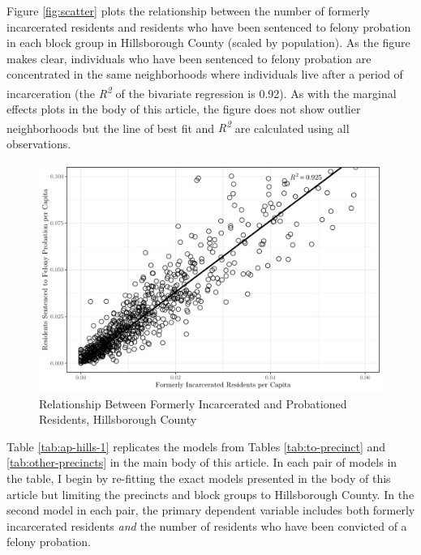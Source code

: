 \documentclass[
  12pt,
]{article}
\begin{document}
Figure \ref{fig:scatter} plots the relationship between the number of formerly incarcerated residents and residents who have been sentenced to felony probation in each block group in Hillsborough County (scaled by population). As the figure makes clear, individuals who have been sentenced to felony probation are concentrated in the same neighborhoods where individuals live after a period of incarceration (the \emph{R\textsuperscript{2}} of the bivariate regression is 0.92). As with the marginal effects plots in the body of this article, the figure does not show outlier neighborhoods but the line of best fit and \emph{R\textsuperscript{2}} are calculated using all observations.

\begin{figure}[H]

{\centering \includegraphics{amendment_4_turnout_blind_files/figure-latex/corrplot-1} 

}

\caption{\label{fig:scatter}Relationship Between Formerly Incarcerated and Probationed Residents, Hillsborough County}\label{fig:corrplot}
\end{figure}

Table \ref{tab:ap-hills-1} replicates the models from Tables \ref{tab:to-precinct} and \ref{tab:other-precincts} in the main body of this article. In each pair of models in the table, I begin by re-fitting the exact models presented in the body of this article but limiting the precincts and block groups to Hillsborough County. In the second model in each pair, the primary dependent variable includes both formerly incarcerated residents \emph{and} the number of residents who have been convicted of a felony probation.
\end{document}
